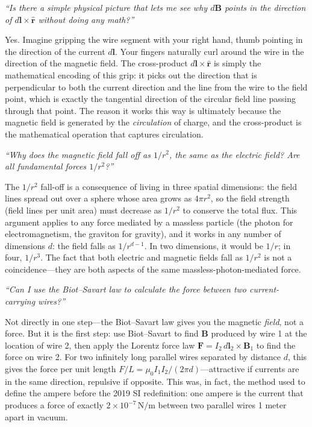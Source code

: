 \textit{``Is there a simple physical picture that lets me see why $d\mathbf{B}$ points in the direction of $d\mathbf{l}\times\hat{\mathbf{r}}$ without doing any math?''}

Yes. Imagine gripping the wire segment with your right hand, thumb pointing in the direction of the current $d\mathbf{l}$. Your fingers naturally curl around the wire in the direction of the magnetic field. The cross-product $d\mathbf{l}\times\hat{\mathbf{r}}$ is simply the mathematical encoding of this grip: it picks out the direction that is perpendicular to both the current direction and the line from the wire to the field point, which is exactly the tangential direction of the circular field line passing through that point. The reason it works this way is ultimately because the magnetic field is generated by the \emph{circulation} of charge, and the cross-product is the mathematical operation that captures circulation.

\textit{``Why does the magnetic field fall off as $1/r^2$, the same as the electric field? Are all fundamental forces $1/r^2$?''}

The $1/r^2$ fall-off is a consequence of living in three spatial dimensions: the field lines spread out over a sphere whose area grows as $4\pi r^2$, so the field strength (field lines per unit area) must decrease as $1/r^2$ to conserve the total flux. This argument applies to any force mediated by a massless particle (the photon for electromagnetism, the graviton for gravity), and it works in any number of dimensions $d$: the field falls as $1/r^{d-1}$. In two dimensions, it would be $1/r$; in four, $1/r^3$. The fact that both electric and magnetic fields fall as $1/r^2$ is not a coincidence---they are both aspects of the same massless-photon-mediated force.

\textit{``Can I use the Biot--Savart law to calculate the force between two current-carrying wires?''}

Not directly in one step---the Biot--Savart law gives you the magnetic \emph{field}, not a force. But it is the first step: use Biot--Savart to find $\mathbf{B}$ produced by wire 1 at the location of wire 2, then apply the Lorentz force law $\mathbf{F} = I_2\,d\mathbf{l}_2\times\mathbf{B}_1$ to find the force on wire 2. For two infinitely long parallel wires separated by distance $d$, this gives the force per unit length $F/L = \mu_0 I_1 I_2/(2\pi d)$---attractive if currents are in the same direction, repulsive if opposite. This was, in fact, the method used to define the ampere before the 2019 SI redefinition: one ampere is the current that produces a force of exactly $2\times 10^{-7}\,\text{N/m}$ between two parallel wires 1 meter apart in vacuum.

